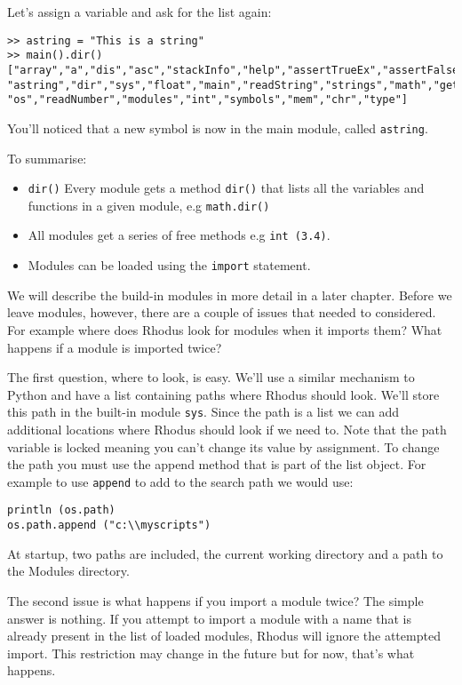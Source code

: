 Let's assign a variable and ask for the list again:

\begin{lstlisting}
>> astring = "This is a string"
>> main().dir()
["array","a","dis","asc","stackInfo","help","assertTrueEx","assertFalseEx","lists",
"astring","dir","sys","float","main","readString","strings","math","getAttr",
"os","readNumber","modules","int","symbols","mem","chr","type"]
\end{lstlisting}

You'll noticed that a new symbol is now in the main module, called {\tt astring}.

To summarise:

\begin{itemize}
\item {\tt dir()} Every module gets a method {\tt dir()} that lists all the variables and functions in a given module, e.g {\tt math.dir()}
\item All modules get a series of free methods e.g {\tt int (3.4)}.
\item Modules can be loaded using the {\tt import} statement.
\end{itemize}

We will describe the build-in modules in more detail in a later chapter. Before we leave modules, however, there are a couple of issues that needed to considered. For example where does Rhodus look for modules when it imports them? What happens if a module is imported twice?

The first question, where to look, is easy. We'll use a similar mechanism to Python and have a list containing paths where Rhodus should look. We'll store this path in the built-in module {\tt sys}. Since the path is a list we can add additional locations where Rhodus should look if we need to. Note that the path variable is locked meaning you can't change its value by assignment. To change the path you must use the append method that is part of the list object. For example to use {\tt append} to add to the search path we would use:

\begin{lstlisting}
println (os.path)
os.path.append ("c:\\myscripts")
\end{lstlisting}

At startup, two paths are included, the current working directory and a path to the Modules directory.

The second issue is what happens if you import a module twice? The simple answer is nothing. If you attempt to import a module with a name that is already present in the list of loaded modules, Rhodus will ignore the attempted import. This restriction may change in the future but for now, that's what happens.

